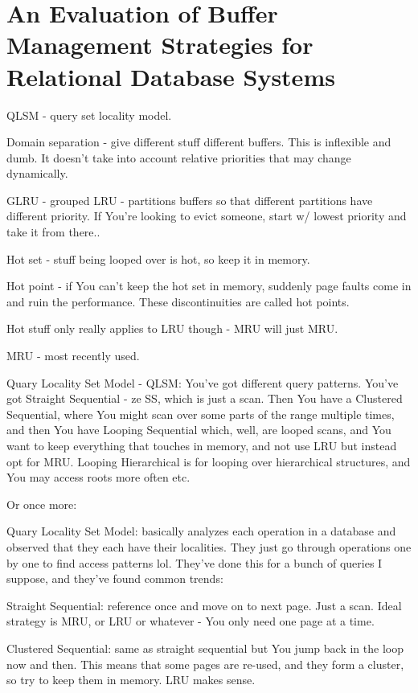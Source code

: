 \documentclass{article}
\begin{document}
			
			
			
			
			
			
\newpage\phantom{asd}
\newpage
\section{An Evaluation of Buffer Management Strategies for
Relational Database Systems}

	QLSM - query set locality model.

	Domain separation - give different stuff different buffers. This is inflexible and dumb. It doesn't take into account relative priorities that may change dynamically.
	
	GLRU - grouped LRU - partitions buffers so that different partitions have different priority. If You're looking to evict someone, start w/ lowest priority and take it from there..
	
	Hot set - stuff being looped over is hot, so keep it in memory.
	
	Hot point - if You can't keep the hot set in memory, suddenly page faults come in and ruin the performance. These discontinuities are called hot points.
	
	Hot stuff only really applies to LRU though - MRU will just MRU.
	
	MRU - most recently used.
	
	Quary Locality Set Model - QLSM: You've got different query patterns. You've got Straight Sequential - ze SS, which is just a scan. Then You have a Clustered Sequential, where You might scan over some parts of the range multiple times, and then You have Looping Sequential which, well, are looped scans, and You want to keep everything that touches in memory, and not use LRU but instead opt for MRU. Looping Hierarchical is for looping over hierarchical structures, and You may access roots more often etc.
	
	Or once more:
	
	Quary Locality Set Model: basically analyzes each operation in a database and observed that they each have their localities. They just go through operations one by one to find access patterns lol. They've done this for a bunch of queries I suppose, and they've found common trends:
	
	Straight Sequential: reference once and move on to next page. Just a scan. Ideal strategy is MRU, or LRU or whatever - You only need one page at a time.
	
	Clustered Sequential: same as straight sequential but You jump back in the loop now and then. This means that some pages are re-used, and they form a cluster, so try to keep them in memory. LRU makes sense.
	
\end{document}
